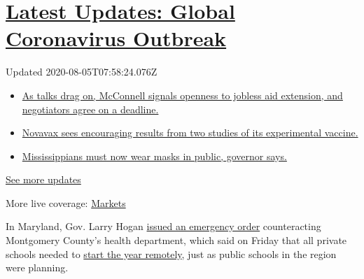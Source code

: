 \hypertarget{latest-updates-global-coronavirus-outbreak}{%
\section{\texorpdfstring{\href{https://www.nytimes3xbfgragh.onion/2020/08/04/world/coronavirus-cases.html?action=click\&pgtype=Article\&state=default\&region=MAIN_CONTENT_1\&context=storylines_live_updates}{Latest
Updates: Global Coronavirus
Outbreak}}{Latest Updates: Global Coronavirus Outbreak}}\label{latest-updates-global-coronavirus-outbreak}}

Updated 2020-08-05T07:58:24.076Z

\begin{itemize}
\tightlist
\item
  \href{https://www.nytimes3xbfgragh.onion/2020/08/04/world/coronavirus-cases.html?action=click\&pgtype=Article\&state=default\&region=MAIN_CONTENT_1\&context=storylines_live_updates\#link-762df92}{As
  talks drag on, McConnell signals openness to jobless aid extension,
  and negotiators agree on a deadline.}
\item
  \href{https://www.nytimes3xbfgragh.onion/2020/08/04/world/coronavirus-cases.html?action=click\&pgtype=Article\&state=default\&region=MAIN_CONTENT_1\&context=storylines_live_updates\#link-1228a480}{Novavax
  sees encouraging results from two studies of its experimental
  vaccine.}
\item
  \href{https://www.nytimes3xbfgragh.onion/2020/08/04/world/coronavirus-cases.html?action=click\&pgtype=Article\&state=default\&region=MAIN_CONTENT_1\&context=storylines_live_updates\#link-794484ed}{Mississippians
  must now wear masks in public, governor says.}
\end{itemize}

\href{https://www.nytimes3xbfgragh.onion/2020/08/04/world/coronavirus-cases.html?action=click\&pgtype=Article\&state=default\&region=MAIN_CONTENT_1\&context=storylines_live_updates}{See
more updates}

More live coverage:
\href{https://www.nytimes3xbfgragh.onion/live/2020/08/04/business/stock-market-today-coronavirus?action=click\&pgtype=Article\&state=default\&region=MAIN_CONTENT_1\&context=storylines_live_updates}{Markets}

In Maryland, Gov. Larry Hogan
\href{https://twitter.com/GovLarryHogan/status/1290330304830246912}{issued
an emergency order} counteracting Montgomery County's health department,
which said on Friday that all private schools needed to
\href{https://www.washingtonpost.com/local/education/montgomery-county-health-officials-tell-private-schools-to-start-school-online/2020/08/01/64552b9e-d3fd-11ea-9038-af089b63ac21_story.html}{start
the year remotely}, just as public schools in the region were planning.

